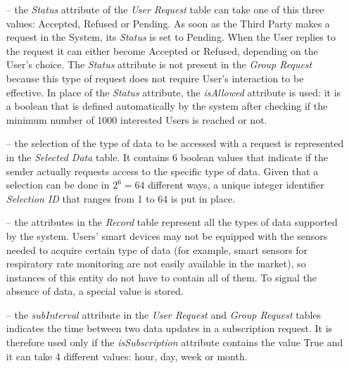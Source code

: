 \begin{itemize}

\item[--] the \textit{Status} attribute of the \textit{User Request} table can take one of this three values: Accepted, Refused or Pending. As soon as the Third Party makes a request in the System, its \textit{Status} is set to Pending. When the User replies to the request it can either become Accepted or Refused, depending on the User's choice.
The \textit{Status} attribute is not present in the \textit{Group Request} because this type of request does not require User's interaction to be effective. In place of the \textit{Status} attribute, the \textit{isAllowed} attribute is used: it is a boolean that is defined automatically by the system after checking if the minimum number of 1000 interested Users is reached or not.

\item[--] the selection of the type of data to be accessed with a request is represented in the \textit{Selected Data} table. It contains 6 boolean values that indicate if the sender actually requests access to the specific type of data.
Given that a selection can be done in $2^6 = 64$ different ways, a unique integer identifier \textit{Selection ID} that ranges from 1 to 64 is put in place.

\item[--] the attributes in the \textit{Record} table represent all the types of data supported by the system. Users’ smart devices may not be equipped with the sensors needed to acquire certain type of data (for example, smart sensors for respiratory rate monitoring are not easily available in the market), so instances of this entity do not have to contain all of them. To signal the absence of data, a special value is stored. 

\item[--] the \textit{subInterval} attribute in the \textit{User Request} and \textit{Group Request} tables indicates the time between two data updates in a subscription request. It is therefore used only if the \textit{isSubscription} attribute contains the value True and it can take 4 different values: hour, day, week or month. 

\end{itemize}

\newpage
